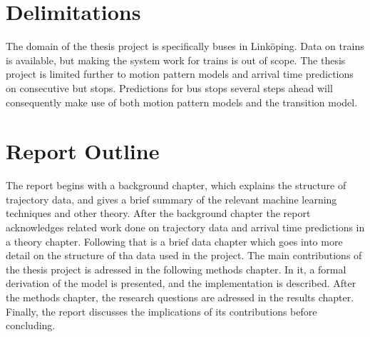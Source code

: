 

\section{Delimitations}\label{sec:delimitations}
The domain of the thesis project is specifically buses in
Linköping. Data on trains is available, but making the system
work for trains is out of scope. The thesis project is limited further
to motion pattern models and arrival time predictions on consecutive
but stops. Predictions for bus stops several steps ahead will
consequently make use of both motion pattern models and the transition model.



\section{Report Outline}
The report begins with a background chapter, which explains the
structure of trajectory data, and gives a brief
summary of the relevant machine learning techniques and other
theory. After the background chapter the report 
acknowledges related work done on trajectory data and arrival time
predictions in a theory chapter. Following that is a brief data
chapter which goes into more detail on the structure of tha data used
in the project. The main contributions of the thesis project is
adressed in the following methods chapter. In it, a formal derivation
of the model is presented, and the implementation is described.
After the methods chapter, the research questions are adressed in the
results chapter. Finally, the report discusses the implications of
its contributions before concluding.
